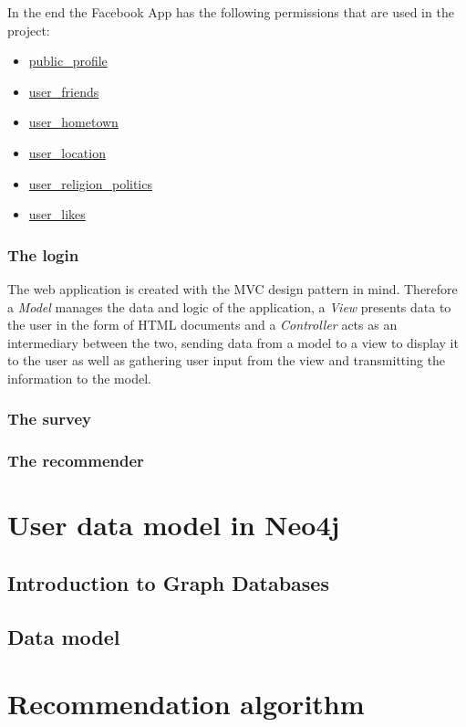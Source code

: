 \documentclass[12pt]{report}
\begin{document}
In the end the Facebook App has the following permissions that are used in the project:
\begin{itemize}
\item \url{public_profile}
\item \url{user_friends}
\item \url{user_hometown}
\item \url{user_location}
\item \url{user_religion_politics}
\item \url{user_likes}
\end{itemize}

\subsubsection{The login}

The web application is created with the MVC design pattern in mind. Therefore a \textit{Model} manages the data and logic of the application, a \textit{View} presents data to the user in the form of HTML documents and a \textit{Controller} acts as an intermediary between the two, sending data from a model to a view to display it to the user as well as gathering user input from the view and transmitting the information to the model.



\subsubsection{The survey}

\subsubsection{The recommender}

%
\section{User data model in Neo4j}

\subsection{Introduction to Graph Databases}

\subsection{Data model}

\section{Recommendation algorithm}
\end{document}
